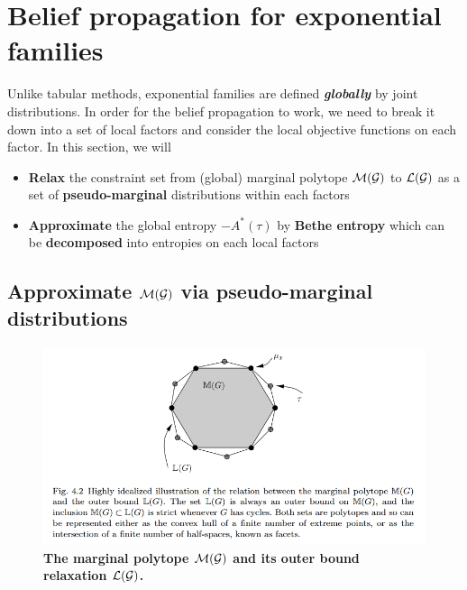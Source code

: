 \documentclass[11pt]{article}
\begin{document}
\section{Belief propagation for exponential families}\label{sec: bp}
Unlike tabular methods, exponential families are defined \emph{\textbf{globally}} by joint distributions. In order for the belief propagation to work, we need to break it down into a set of local factors  and consider the local objective functions on each factor. In this section, we will
\begin{itemize}
\item \textbf{Relax} the constraint set from (global) marginal polytope ${\mathcal M}({\mathcal G})$ to ${\mathcal L}({\mathcal G})$ as a set of \textbf{pseudo-marginal} distributions within each factors

\item \textbf{Approximate} the global entropy $-A^{*}(\tau)$  by \textbf{Bethe entropy} which can be \textbf{decomposed} into entropies on each local factors 
\end{itemize}

\subsection{Approximate ${\mathcal M}({\mathcal G})$ via pseudo-marginal distributions}
\begin{figure}
\begin{minipage}[t]{1\linewidth}
  \centering
  \centerline{\includegraphics[scale = 0.5]{outbound_marginal.png}}
\end{minipage}
\caption{\footnotesize{\textbf{The marginal polytope ${\mathcal M}({\mathcal G})$ and its outer bound relaxation ${\mathcal L}({\mathcal G})$.}}}
\label{fig: outbound_marginal}
\end{figure}
\end{document}
